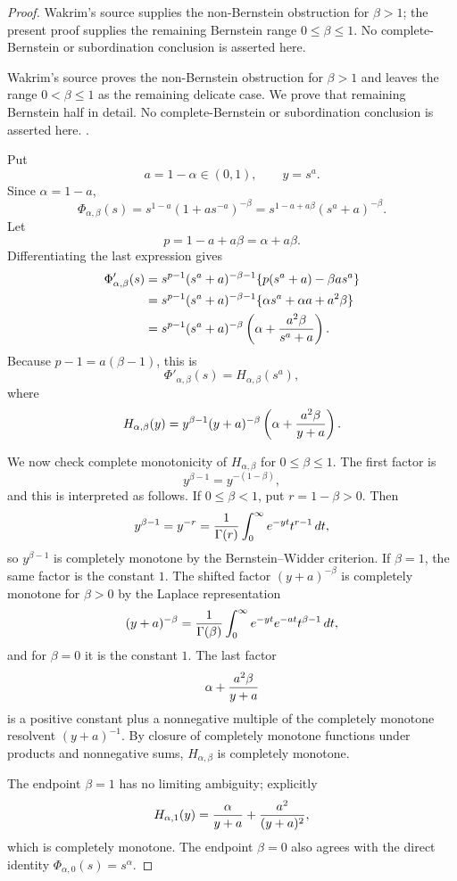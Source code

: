 \begin{proof}
Wakrim's source \cite{wakrim-w} supplies the non-Bernstein obstruction for \(\beta>1\); the present proof supplies the remaining Bernstein range \(0\le\beta\le1\). No complete-Bernstein or subordination conclusion is asserted here.

Wakrim's source proves the non-Bernstein obstruction for \(\beta>1\) and
leaves the range \(0<\beta\le1\) as the remaining delicate case.  We prove
that remaining Bernstein half in detail.  No complete-Bernstein or
subordination conclusion is asserted here. \cite{wakrim-w}.

Put
\[
  a=1-\alpha\in(0,1),\qquad y=s^a .
\]
Since \(\alpha=1-a\),
\[
 \Phi_{\alpha,\beta}(s)
 =s^{1-a}(1+a s^{-a})^{-\beta}
 =s^{1-a+a\beta}(s^a+a)^{-\beta}.
\]
Let
\[
  p=1-a+a\beta=\alpha+a\beta .
\]
Differentiating the last expression gives
\[
\begin{aligned}
 \Phi'_{\alpha,\beta}(s)
 &=s^{p-1}(s^a+a)^{-\beta-1}
     \{p(s^a+a)-\beta a s^a\}  \\
 &=s^{p-1}(s^a+a)^{-\beta-1}
     \{\alpha s^a+\alpha a+a^2\beta\}       \\
 &=s^{p-1}(s^a+a)^{-\beta}
     \left(\alpha+{a^2\beta\over s^a+a}\right).
\end{aligned}
\]
Because \(p-1=a(\beta-1)\), this is
\[
  \Phi'_{\alpha,\beta}(s)=H_{\alpha,\beta}(s^a),
\]
where
\[
 H_{\alpha,\beta}(y)
 =y^{\beta-1}(y+a)^{-\beta}
      \left(\alpha+{a^2\beta\over y+a}\right).
\]

We now check complete monotonicity of \(H_{\alpha,\beta}\) for
\(0\le\beta\le1\).  The first factor is
\[
  y^{\beta-1}=y^{-(1-\beta)},
\]
and this is interpreted as follows.  If \(0\le\beta<1\), put
\(r=1-\beta>0\).  Then
\[
  y^{\beta-1}=y^{-r}
  ={1\over\Gamma(r)}
    \int_0^\infty e^{-yt}t^{r-1}\,dt,
\]
so \(y^{\beta-1}\) is completely monotone by the Bernstein--Widder
criterion.  If \(\beta=1\), the same factor is the constant \(1\).  The shifted factor
\((y+a)^{-\beta}\) is completely monotone for \(\beta>0\) by the Laplace
representation
\[
 (y+a)^{-\beta}
 ={1\over\Gamma(\beta)}
   \int_0^\infty e^{-yt}e^{-at}t^{\beta-1}\,dt,
\]
and for \(\beta=0\) it is the constant \(1\).  The last factor
\[
  \alpha+{a^2\beta\over y+a}
\]
is a positive constant plus a nonnegative multiple of the completely monotone
resolvent \((y+a)^{-1}\).  By closure of completely monotone functions under
products and nonnegative sums, \(H_{\alpha,\beta}\) is completely monotone.

The endpoint \(\beta=1\) has no limiting ambiguity; explicitly
\[
 H_{\alpha,1}(y)
 ={\alpha\over y+a}+{a^2\over (y+a)^2},
\]
which is completely monotone.  The endpoint \(\beta=0\) also agrees with the
direct identity \(\Phi_{\alpha,0}(s)=s^\alpha\).


\end{proof}
